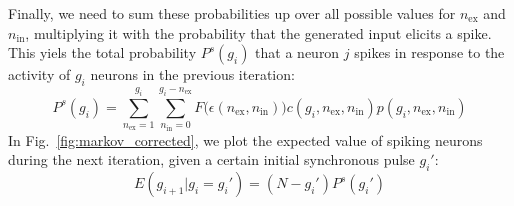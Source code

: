 \documentclass[10pt,a4paper,onecolumn]{article}
\begin{document}
Finally, we need to sum these probabilities up over all possible values for $n_\text{ex}$ and $n_\text{in}$, multiplying it with the probability that the generated input elicits a spike. This yiels the total probability $P^s(g_i)$ that a neuron $j$ spikes in response to the activity of $g_i$ neurons in the previous iteration:
\begin{equation}
P^s(g_i) = \sum_{n_\text{ex}=1}^{g_i}\sum_{n_\text{in}=0}^{g_i-n_\text{ex}} F\big(\epsilon(n_\text{ex}, n_\text{in})\big) c(g_i, n_\text{ex}, n_\text{in}) p(g_i, n_\text{ex}, n_\text{in})
\end{equation}
In Fig.~\ref{fig:markov_corrected}, we plot the expected value of spiking neurons during the next iteration, given a certain initial synchronous pulse $g_i'$:
\begin{equation}
E(g_{i+1}|g_i = g_i') = (N - g_i') P^s(g_i')
\end{equation}
\end{document}
